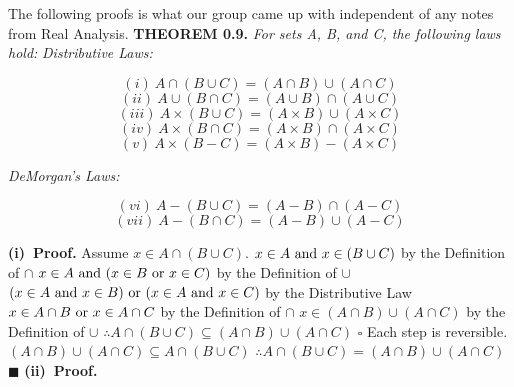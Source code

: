 \documentclass[12pt]{article}
\begin{document}
	The following proofs is what our group came up with independent of any notes from Real Analysis. \newline \newline
	\textbf{THEOREM 0.9.} \textit{For sets A, B, and C, the following laws hold:}
	\newline
	\newline
	\textit{Distributive Laws:}
	\begin{adjustwidth}{-3cm}{0cm}
		\[(i)\ A \cap (B \cup C) = (A \cap B) \cup (A \cap C) \]
		\[(ii)\ A \cup (B \cap C) = (A \cup B) \cap (A \cup C) \]
		\[(iii)\ A \times (B \cup C) = (A \times B) \cup (A \times C) \]
		\[(iv)\ A \times (B \cap C) = (A \times B) \cap (A \times C) \]
		\[(v)\ A \times (B - C) = (A \times B) - (A \times C) \]
	\end{adjustwidth}
	\textit{DeMorgan's Laws:}
	\begin{adjustwidth}{-3cm}{0cm}
		\[(vi)\ A - (B \cup C) = (A - B) \cap (A - C) \]
		\[(vii)\ A - (B \cap C) = (A - B) \cup (A - C) \]
	\end{adjustwidth}
	\[\ \]
	\textbf{(i)\ Proof.}
	\newline
	Assume \(x \in A \cap (B \cup C)\). \newline
	\(x \in A \textup{ and } x \in (B \cup C)\) by the Definition of \(\cap\)
	\newline
	\(x \in A \textup{ and } (x \in B \textup{ or } x \in C)\) by the Definition of \(\cup\)
	\newline
	\((x \in A \textup{ and } x \in B) \textup{ or } (x \in A \textup{ and } x \in C)\) by the Distributive Law
	\newline
	\(x \in A \cap B \textup{ or } x \in A \cap C\) by the Definition of \(\cap\)
	\newline
	\(x \in (A \cap B) \cup (A \cap C)\) by the Definition of \(\cup\)
	\newline
	\(\therefore A \cap (B \cup C) \subseteq (A \cap B) \cup (A \cap C)\)
	\newline \(\square\) \newline
	Each step is reversible.
	\newline
	\((A \cap B) \cup (A \cap C) \subseteq A \cap (B \cup C)\)
	\newline
	\(\therefore A \cap (B \cup C) = (A \cap B) \cup (A \cap C)\)
	\newline \(\blacksquare\) \newline \newline
	\textbf{(ii)\ Proof.}
	\newline
\end{document}
